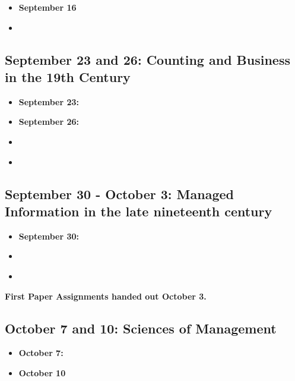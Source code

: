 \begin{itemize}
\item
  \textbf{September 16} \cite{borges_analytical_1999}
\item
  \cite[Introduction and Chapter 3]{foucault_order_1994}
\end{itemize}

\subsection{September 23 and 26: Counting and Business in the 19th
Century}

\begin{itemize}
\item
  \textbf{September 23:} \cite{edwards_early_1960}
\item
  \textbf{September 26:} \cite{garvey_facts_2013}
\item
  \cite[pp. 192-209,233-258]{fogel_time_1989}
\item
  \cite["GW Hammond, Instructions to his Overseer"]{wilentz_major_1992}
\end{itemize}

\subsection{September 30 - October 3: Managed Information in the late
nineteenth century}

\begin{itemize}
\item
  \textbf{September 30:}
  \cite[Chapter 6, "Industrial Revolution and the Crisis of Control"]{beniger_control_1986}
\item
  \cite{kinnahan_charting_2008}
\item
  \cite[Chapters 3 to 5]{anderson_american_1988}
\end{itemize}

\textbf{First Paper Assignments handed out October 3.}

\subsection{October 7 and 10: Sciences of Management}

\begin{itemize}
\item
  \textbf{October 7:} \cite{taylor_principles_2006}
\item
  \textbf{October 10} \cite[Chapters 5 and 6]{meyer_five_1981}
\end{itemize}

